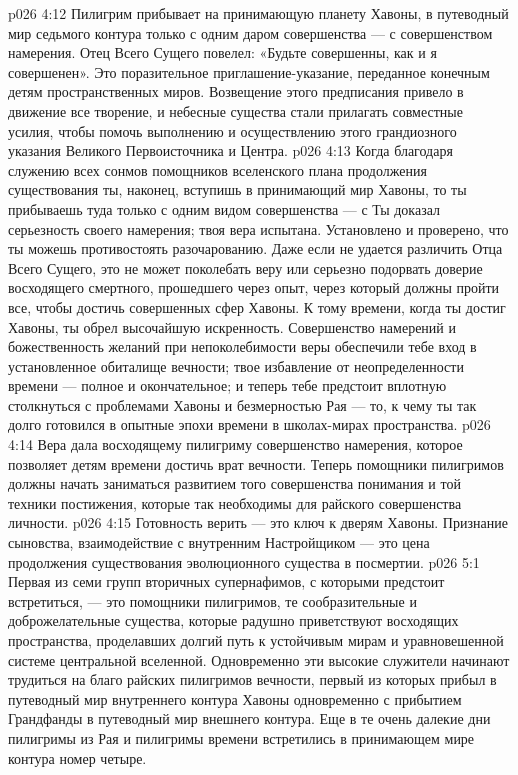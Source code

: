 \vs p026 4:12 Пилигрим прибывает на принимающую планету Хавоны, в путеводный мир седьмого контура только с одним даром совершенства --- с совершенством намерения. Отец Всего Сущего повелел: «Будьте совершенны, как и я совершенен». Это поразительное приглашение\hyp{}указание, переданное конечным детям пространственных миров. Возвещение этого предписания привело в движение все творение, и небесные существа стали прилагать совместные усилия, чтобы помочь выполнению и осуществлению этого грандиозного указания Великого Первоисточника и Центра.
\vs p026 4:13 Когда благодаря служению всех сонмов помощников вселенского плана продолжения существования ты, наконец, вступишь в принимающий мир Хавоны, то ты прибываешь туда только с одним видом совершенства --- с  Ты доказал серьезность своего намерения; твоя вера испытана. Установлено и проверено, что ты можешь противостоять разочарованию. Даже если не удается различить Отца Всего Сущего, это не может поколебать веру или серьезно подорвать доверие восходящего смертного, прошедшего через опыт, через который должны пройти все, чтобы достичь совершенных сфер Хавоны. К тому времени, когда ты достиг Хавоны, ты обрел высочайшую искренность. Совершенство намерений и божественность желаний при непоколебимости веры обеспечили тебе вход в установленное обиталище вечности; твое избавление от неопределенности времени --- полное и окончательное; и теперь тебе предстоит вплотную столкнуться с проблемами Хавоны и безмерностью Рая --- то, к чему ты так долго готовился в опытные эпохи времени в школах\hyp{}мирах пространства.
\vs p026 4:14 Вера дала восходящему пилигриму совершенство намерения, которое позволяет детям времени достичь врат вечности. Теперь помощники пилигримов должны начать заниматься развитием того совершенства понимания и той техники постижения, которые так необходимы для райского совершенства личности.
\vs p026 4:15  Готовность верить --- это ключ к дверям Хавоны. Признание сыновства, взаимодействие с внутренним Настройщиком --- это цена продолжения существования эволюционного существа в посмертии.
\vs p026 5:1 Первая из семи групп вторичных супернафимов, с которыми предстоит встретиться, --- это помощники пилигримов, те сообразительные и доброжелательные существа, которые радушно приветствуют восходящих пространства, проделавших долгий путь к устойчивым мирам и уравновешенной системе центральной вселенной. Одновременно эти высокие служители начинают трудиться на благо райских пилигримов вечности, первый из которых прибыл в путеводный мир внутреннего контура Хавоны одновременно с прибытием Грандфанды в путеводный мир внешнего контура. Еще в те очень далекие дни пилигримы из Рая и пилигримы времени встретились в принимающем мире контура номер четыре.
